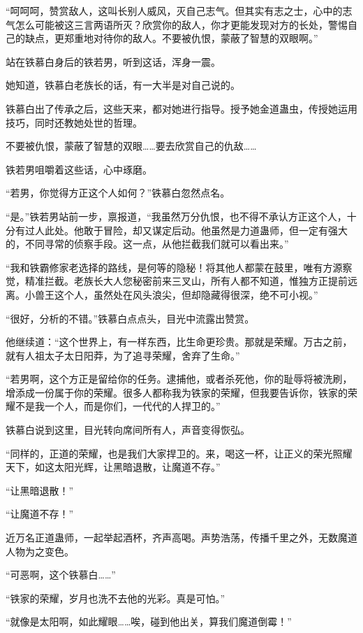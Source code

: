 \begin{this_body}
“呵呵呵，赞赏敌人，这叫长别人威风，灭自己志气。但其实有志之士，心中的志气怎么可能被这三言两语所灭？欣赏你的敌人，你才更能发现对方的长处，警惕自己的缺点，更郑重地对待你的敌人。不要被仇恨，蒙蔽了智慧的双眼啊。”

站在铁慕白身后的铁若男，听到这话，浑身一震。

她知道，铁慕白老族长的话，有一大半是对自己说的。

铁慕白出了传承之后，这些天来，都对她进行指导。授予她金道蛊虫，传授她运用技巧，同时还教她处世的哲理。

不要被仇恨，蒙蔽了智慧的双眼……要去欣赏自己的仇敌……

铁若男咀嚼着这些话，心中琢磨。

“若男，你觉得方正这个人如何？”铁慕白忽然点名。

“是。”铁若男站前一步，禀报道，“我虽然万分仇恨，也不得不承认方正这个人，十分有过人此处。他敢于冒险，却又谋定后动。他虽然是力道蛊师，但一定有强大的，不同寻常的侦察手段。这一点，从他拦截我们就可以看出来。”

“我和铁霸修家老选择的路线，是何等的隐秘！将其他人都蒙在鼓里，唯有方源察觉，精准拦截。老族长大人您秘密前来三叉山，所有人都不知道，惟独方正提前远离。小兽王这个人，虽然处在风头浪尖，但却隐藏得很深，绝不可小视。”

“很好，分析的不错。”铁慕白点点头，目光中流露出赞赏。

他继续道：“这个世界上，有一样东西，比生命更珍贵。那就是荣耀。万古之前，就有人祖太子太日阳莽，为了追寻荣耀，舍弃了生命。”

“若男啊，这个方正是留给你的任务。逮捕他，或者杀死他，你的耻辱将被洗刷，增添成一份属于你的荣耀。很多人都称我为铁家的荣耀，但我要告诉你，铁家的荣耀不是我一个人，而是你们，一代代的人捍卫的。”

铁慕白说到这里，目光转向席间所有人，声音变得恢弘。

“同样的，正道的荣耀，也是我们大家捍卫的。来，喝这一杯，让正义的荣光照耀天下，如这太阳光辉，让黑暗退散，让魔道不存。”

“让黑暗退散！”

“让魔道不存！”

近万名正道蛊师，一起举起酒杯，齐声高喝。声势浩荡，传播千里之外，无数魔道人物为之变色。

“可恶啊，这个铁慕白……”

“铁家的荣耀，岁月也洗不去他的光彩。真是可怕。”

“就像是太阳啊，如此耀眼……唉，碰到他出关，算我们魔道倒霉！”

\end{this_body}

